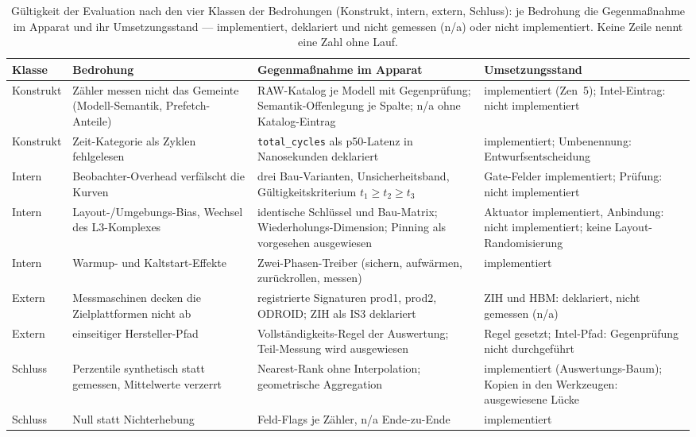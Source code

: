 \begin{nurlang}
\begin{table}[htbp]
\begin{tabular}{@{}>{\raggedright\arraybackslash}p{1.6cm}>{\raggedright\arraybackslash}p{4.0cm}>{\raggedright\arraybackslash}p{4.9cm}>{\raggedright\arraybackslash}p{3.7cm}@{}}
\toprule
Klasse & Bedrohung & Gegenmaßnahme im Apparat & Umsetzungsstand \\
\midrule
Konstrukt & Zähler messen nicht das Gemeinte (Modell-Semantik, Prefetch-Anteile) & RAW-Katalog je Modell mit Gegenprüfung; Semantik-Offenlegung je Spalte; n/a ohne Katalog-Eintrag & implementiert (Zen~5); Intel-Eintrag: nicht implementiert \\
Konstrukt & Zeit-Kategorie als Zyklen fehlgelesen & \texttt{total\_cycles} als p50-Latenz in Nanosekunden deklariert & implementiert; Umbenennung: Entwurfsentscheidung \\
Intern & Beobachter-Overhead verfälscht die Kurven & drei Bau-Varianten, Unsicherheitsband, Gültigkeitskriterium $t_1 \ge t_2 \ge t_3$ & Gate-Felder implementiert; Prüfung: nicht implementiert \\
Intern & Layout-/Umgebungs-Bias, Wechsel des L3-Komplexes & identische Schlüssel und Bau-Matrix; Wiederholungs-Dimension; Pinning als vorgesehen ausgewiesen & Aktuator implementiert, Anbindung: nicht implementiert; keine Layout-Randomisierung \\
Intern & Warmup- und Kaltstart-Effekte & Zwei-Phasen-Treiber (sichern, aufwärmen, zurückrollen, messen) & implementiert \\
Extern & Messmaschinen decken die Zielplattformen nicht ab & registrierte Signaturen prod1, prod2, ODROID\@; ZIH als IS3 deklariert & ZIH und HBM\@: deklariert, nicht gemessen (n/a) \\
Extern & einseitiger Hersteller-Pfad & Vollständigkeits-Regel der Auswertung; Teil-Messung wird ausgewiesen & Regel gesetzt; Intel-Pfad: Gegenprüfung nicht durchgeführt \\
Schluss & Perzentile synthetisch statt gemessen, Mittelwerte verzerrt & Nearest-Rank ohne Interpolation; geometrische Aggregation & implementiert (Auswertungs-Baum); Kopien in den Werkzeugen: ausgewiesene Lücke \\
Schluss & Null statt Nichterhebung & Feld-Flags je Zähler, n/a Ende-zu-Ende & implementiert \\
\bottomrule
\end{tabular}
\caption{Gültigkeit der Evaluation nach den vier Klassen der Bedrohungen (Konstrukt, intern, extern,
Schluss): je Bedrohung die Gegenmaßnahme im Apparat und ihr Umsetzungsstand --- implementiert,
deklariert und nicht gemessen (n/a) oder nicht implementiert. Keine Zeile nennt eine Zahl ohne
Lauf.}\label{tab:eval-gueltigkeit}
\end{table}
\end{nurlang}
